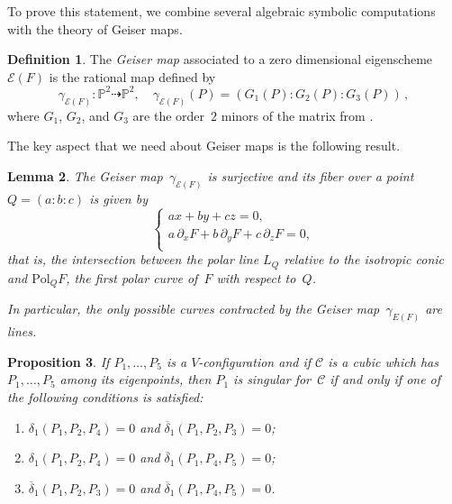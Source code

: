 \documentclass[11pt, a4paper, reqno, captions=tableheading,bibliography=totoc]{scrartcl}
\theoremstyle{plain}
\newtheorem{lemma}{Lemma}[section]
\newtheorem{prop}[lemma]{Proposition}
\theoremstyle{definition}
\newtheorem{definition}[lemma]{Definition}
\newcommand{\p}{\mathbb{P}}
\newcommand{\Eig}[1]{\mathcal{E}\!\left( {#1} \right)}
\begin{document}
To prove this statement, we combine several algebraic symbolic computations with the theory of Geiser maps.

\begin{definition}
The \emph{Geiser map} associated to a zero dimensional eigenscheme $\Eig{F}$ is the rational map defined by
%
\[
 \gamma_{\Eig{F}} \colon \p ^2 \dasharrow \p^2, \quad
 \gamma_{\Eig{F}} (P) = (G_1(P):G_2(P):G_3(P)) \,,
\]
%
where $G_1$, $G_2$, and $G_3$ are the order~$2$ minors of the matrix from .
\end{definition}

The key aspect that we need about Geiser maps is the following result.

\begin{lemma}
The Geiser map~$\gamma_{\Eig{F}}$ is surjective and its fiber over a point $Q = (a:b:c)$ is given by
%
\begin{equation}
\label{eq:fibers}
    \left\{
    \begin{array}{l}
    a x + by + cz = 0, \\[2pt]
    a \, \partial_x F + b \, \partial_y F + c \, \partial_z F = 0,\\
 \end{array}\right.
\end{equation}
%
that is, the intersection between the polar line $L_Q$ relative to the isotropic conic and $\mathrm{Pol}_Q F$, the
first polar curve of~$F$ with respect to~$Q$.

In particular, the only possible curves contracted by the Geiser map~$\gamma _{E(F)}$ are lines.
\end{lemma}

\begin{prop}
\label{proposition:P1_sing}
If $P_1, \dots, P_5$ is a $V$-configuration and if $\mathcal{C}$ is a cubic which
has $P_1, \dots, P_5$ among its eigenpoints, then $P_1$ is singular for~$\mathcal{C}$ if
and only if one of the following conditions is satisfied:
%
\begin{enumerate}
 \item $\delta_1(P_1, P_2, P_4) = 0$ and $\overline{\delta}_1(P_1, P_2, P_3) = 0$;
 \item $\delta_1(P_1, P_2, P_4) = 0$ and $\overline{\delta}_1(P_1, P_4, P_5) = 0$;
 \item $\overline{\delta}_1(P_1, P_2, P_3) = 0$ and
$\overline{\delta}_1(P_1, P_4, P_5) = 0$.
\end{enumerate}
%
\end{prop}
\end{document}
